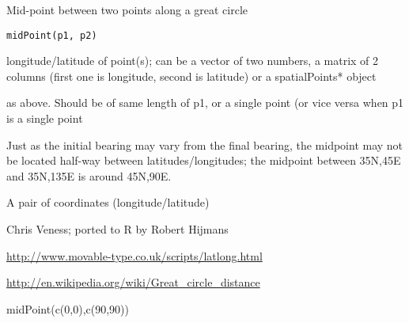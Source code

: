 \begin{Description}\relax
Mid-point between two points along a great circle
\end{Description}
\begin{Usage}
\begin{verbatim}
midPoint(p1, p2)
\end{verbatim}
\end{Usage}
\begin{Arguments}
\begin{ldescription}
\item[\code{p1}] longitude/latitude of point(s); can be a vector of two numbers, a matrix of 2 columns (first one is longitude, second is latitude) or a spatialPoints* object
\item[\code{p2}] as above. Should be of same length of p1, or a single point (or vice versa when p1 is a single point
\end{ldescription}
\end{Arguments}
\begin{Details}\relax
Just as the initial bearing may vary from the final bearing, the midpoint may not be located half-way between latitudes/longitudes; the midpoint between 35N,45E and 35N,135E is around 45N,90E.
\end{Details}
\begin{Value}
A pair of coordinates (longitude/latitude)
\end{Value}
\begin{Author}\relax
Chris Veness; ported to R by Robert Hijmans
\end{Author}
\begin{References}\relax
\url{http://www.movable-type.co.uk/scripts/latlong.html}

\url{http://en.wikipedia.org/wiki/Great_circle_distance}
\end{References}
\begin{Examples}
\begin{ExampleCode}
midPoint(c(0,0),c(90,90))  
\end{ExampleCode}
\end{Examples}

